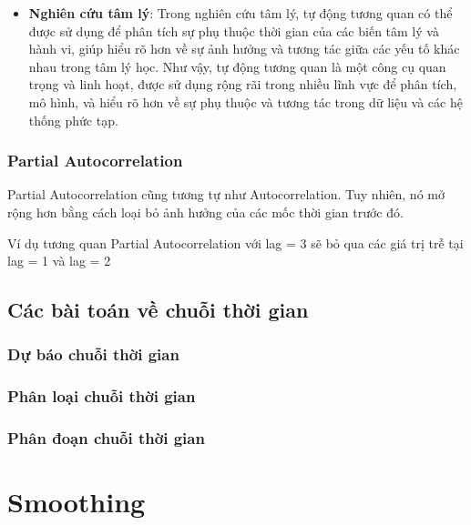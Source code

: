 \documentclass[
]{book}
\providecommand{\tightlist}{%
  \setlength{\itemsep}{0pt}\setlength{\parskip}{0pt}}
\begin{document}
\begin{itemize}
  \begin{itemize}
  \tightlist
  \item
    \textbf{Nghiên cứu tâm lý}: Trong nghiên cứu tâm lý, tự động tương quan có thể được sử dụng để phân tích sự phụ thuộc thời gian của các biến tâm lý và hành vi, giúp hiểu rõ hơn về sự ảnh hưởng và tương tác giữa các yếu tố khác nhau trong tâm lý học.
    Như vậy, tự động tương quan là một công cụ quan trọng và linh hoạt, được sử dụng rộng rãi trong nhiều lĩnh vực để phân tích, mô hình, và hiểu rõ hơn về sự phụ thuộc và tương tác trong dữ liệu và các hệ thống phức tạp.
  \end{itemize}
\end{itemize}

\subsection{Partial Autocorrelation}\label{partial-autocorrelation}

Partial Autocorrelation cũng tương tự như Autocorrelation. Tuy nhiên, nó mở rộng hơn bằng cách loại bỏ ảnh hưởng của các mốc thời gian trước đó.

Ví dụ tương quan Partial Autocorrelation với lag = 3 sẽ bỏ qua các giá trị trễ tại lag = 1 và lag = 2

\section{Các bài toán về chuỗi thời gian}\label{cuxe1c-buxe0i-touxe1n-vux1ec1-chuux1ed7i-thux1eddi-gian}

\subsection{Dự báo chuỗi thời gian}\label{dux1b0-bao-chuuxf4i-thux1a1i-gian}

\subsection{Phân loại chuỗi thời gian}\label{phuxe2n-loux1ea1i-chuux1ed7i-thux1eddi-gian}

\subsection{Phân đoạn chuỗi thời gian}\label{phuxe2n-ux111oux1ea1n-chuux1ed7i-thux1eddi-gian}

\chapter{Smoothing}\label{smoothing}
\end{document}
